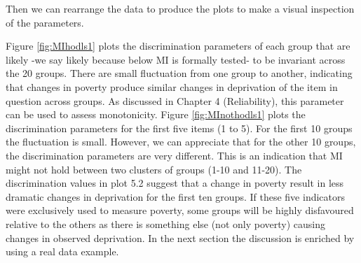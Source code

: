 \documentclass[]{book}
\newenvironment{Shaded}{\begin{snugshade}}{\end{snugshade}}
\newcommand{\DataTypeTok}[1]{\textcolor[rgb]{0.13,0.29,0.53}{#1}}
\newcommand{\DecValTok}[1]{\textcolor[rgb]{0.00,0.00,0.81}{#1}}
\newcommand{\KeywordTok}[1]{\textcolor[rgb]{0.13,0.29,0.53}{\textbf{#1}}}
\newcommand{\NormalTok}[1]{#1}
\newcommand{\OperatorTok}[1]{\textcolor[rgb]{0.81,0.36,0.00}{\textbf{#1}}}
\newcommand{\StringTok}[1]{\textcolor[rgb]{0.31,0.60,0.02}{#1}}
\begin{document}
Then we can rearrange the data to produce the plots to make a visual inspection of the parameters.

\begin{Shaded}
\end{Shaded}

Figure \ref{fig:MIhodls1} plots the discrimination parameters of each group that are likely -we say likely because below MI is formally tested- to be invariant across the 20 groups. There are small fluctuation from one group to another, indicating that changes in poverty produce similar changes in deprivation of the item in question across groups. As discussed in Chapter 4 (Reliability), this parameter can be used to assess monotonicity. Figure \ref{fig:MInothodls1} plots the discrimination parameters for the first five items (1 to 5). For the first 10 groups the fluctuation is small. However, we can appreciate that for the other 10 groups, the discrimination parameters are very different. This is an indication that MI might not hold between two clusters of groups (1-10 and 11-20). The discrimination values in plot 5.2 suggest that a change in poverty result in less dramatic changes in deprivation for the first ten groups. If these five indicators were exclusively used to measure poverty, some groups will be highly disfavoured relative to the others as there is something else (not only poverty) causing changes in observed deprivation. In the next section the discussion is enriched by using a real data example.
\end{document}
